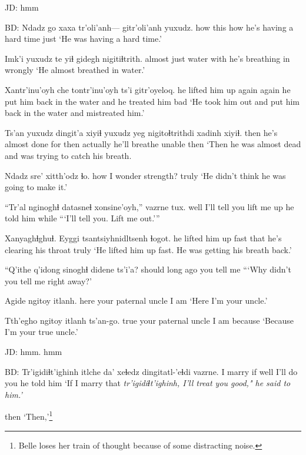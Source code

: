 \documentclass[12pt]{article}
\begin{document}
JD:  hmm

BD:  
\gll Ndadz go xaxa tr'oli'anh---            gitr'oli'anh            yuxudz.
how   this how   {}     {he's having a hard time} just
\glt `He was having a hard time.'
\glend

\gll Imk'i yuxudz te yiɬ     {gidegh nigitiɬtrith}.
almost just  water with {he's breathing in wrongly}
\glt `He almost breathed in water.'
\glend

\gll Xantr'inu'oyh         che tontr'inu'oyh                ts'i gitr'oyeloq. 
{he lifted him up again} again {he put him back in the water} and  {he treated him bad}
\glt `He took him out and put him back in the water and mistreated him.'
\glend

\gll Ts'an {yuxudz dingit'a}      xiyiɬ {yuxudz yeg} nigitoɬtrithdi   xadinh     xiyiɬ.
then   {he's almost done for} then actually      {he'll breathe} unable then
\glt `Then he was almost dead and was trying to catch his breath.
\glend

\gll Ndadz sre' xitth'odz  ɬo.
how {I wonder}    strength? truly
\glt `He didn't think he was going to make it.'
\glend

\gll ``Tr'al {nginoghɬ  datasneɬ} xonsine'oyh,'' vazrne tux.
well  {I'll tell you}      {lift me up}  {he told him} while
\glt ```I'll tell you. Lift me out.'''
\glend

\gll Xanyaghɬghuɬ.  Eyggi              tsantsiyhnidltsenh                ɬogot.
{he lifted him up fast} that  {he's clearing his throat} truly
\glt `He lifted him up fast. He was getting his breath back.'             
\glend

\gll ``Q'ithe   q'idong  {sinoghɬ didene} ts'i'a?
should {long ago} {you tell me}
\glt ```Why didn't you tell me right away?'
\glend

\gll Agide ngitoy     itlanh. 
here  {your paternal uncle} {I am}
\glt `Here I'm your uncle.'
\glend

\gll Tth'egho ngitoy     itlanh ts'an-go.
true     {your paternal uncle} {I am}   because
\glt `Because I'm your true uncle.'
\glend

JD:  hmm. hmm

BD: 
\gll Tr'igidiɬt'ighinh itlche  da' xeɬedz dingitatl-'eɬdi  vazrne.
{}                {I marry} if  well {I'll do you} {he told him}
\glt `If I marry that \em tr'igidiɬt'ighinh, \em I'll treat you good," he said to him.'
\glend

then              
\glt `Then,'\footnote{Belle loses her train of thought because of some distracting noise.}
\glend
\end{document}
